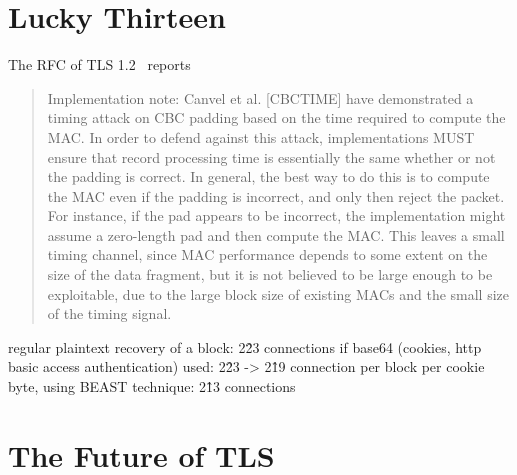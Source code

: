 \documentclass[10pt,conference,a4paper]{IEEEtran}
\begin{document}
\section{Lucky Thirteen}
\label{sec:lucky}
The RFC of TLS 1.2~\cite{ietf2008transport} reports
\begin{quote}
Implementation note: Canvel et al. [CBCTIME] have demonstrated a timing attack on CBC padding based on the time required to compute the MAC.  In order to defend against this attack, implementations MUST ensure that record processing time is essentially the same whether or not the padding is correct.  In general, the best way to do this is to compute the MAC even if the padding is incorrect, and only then reject the packet.  For instance, if the pad appears to be incorrect, the implementation might assume a zero-length pad and then compute the MAC.  This leaves a small timing channel, since MAC performance depends to some extent on the size of the data fragment, but it is not believed to be large enough to be exploitable, due to the large block size of existing MACs and the small size of the timing signal.
\end{quote}




regular plaintext recovery of a block: 2\^23 connections
if base64 (cookies, http basic access authentication) used: 2\^23 -> 2\^19 connection per block
per cookie byte, using BEAST technique: 2\^13 connections

\section{The Future of TLS}
\label{sec:future}


%

\end{document}
